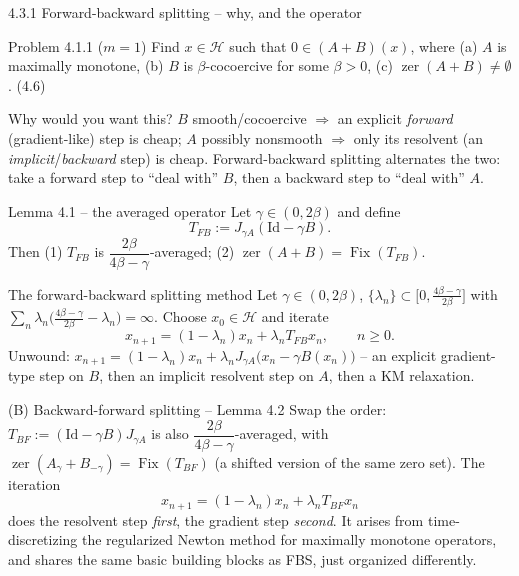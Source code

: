 \documentclass[aspectratio=169,10pt]{beamer}
\newcommand{\Id}{\mathrm{Id}}
\newcommand{\Fix}{\operatorname{Fix}}
\newcommand{\zer}{\operatorname{zer}}
\begin{document}
\begin{frame}[allowframebreaks]{4.3.1 Forward-backward splitting -- why, and the operator}
  \begin{block}{Problem 4.1.1 ($m=1$)}
    Find $x\in\mathcal H$ such that $0\in(A+B)(x)$, where (a) $A$ is maximally monotone, (b) $B$ is $\beta$-cocoercive for some $\beta>0$, (c) $\zer(A+B)\ne\emptyset$. (4.6)
  \end{block}
  \begin{block}{Why would you want this?}
    $B$ smooth/cocoercive $\Rightarrow$ an explicit \emph{forward} (gradient-like) step is cheap; $A$ possibly nonsmooth $\Rightarrow$ only its resolvent (an \emph{implicit}/\emph{backward} step) is cheap. Forward-backward splitting alternates the two: take a forward step to ``deal with'' $B$, then a backward step to ``deal with'' $A$.
  \end{block}
  \begin{block}{Lemma 4.1 -- the averaged operator}
    Let $\gamma\in(0,2\beta)$ and define
    \[
      T_{FB} := J_{\gamma A}(\Id-\gamma B).
    \]
    Then (1) $T_{FB}$ is $\dfrac{2\beta}{4\beta-\gamma}$-averaged; (2) $\zer(A+B)=\Fix(T_{FB})$.
  \end{block}

  \framebreak

  \begin{block}{The forward-backward splitting method}
    Let $\gamma\in(0,2\beta)$, $\{\lambda_n\}\subset\big[0,\tfrac{4\beta-\gamma}{2\beta}\big]$ with $\sum_n\lambda_n\big(\tfrac{4\beta-\gamma}{2\beta}-\lambda_n\big)=\infty$. Choose $x_0\in\mathcal H$ and iterate
    \begin{equation*}
      x_{n+1} = (1-\lambda_n)x_n + \lambda_n T_{FB}x_n, \qquad n\ge0. \tag{4.7}
    \end{equation*}
    Unwound: $x_{n+1}=(1-\lambda_n)x_n+\lambda_n J_{\gamma A}\big(x_n-\gamma B(x_n)\big)$ -- an explicit gradient-type step on $B$, then an implicit resolvent step on $A$, then a KM relaxation.
  \end{block}
  \begin{block}{(B) Backward-forward splitting -- Lemma 4.2}
    Swap the order: $T_{BF}:=(\Id-\gamma B)J_{\gamma A}$ is also $\dfrac{2\beta}{4\beta-\gamma}$-averaged, with $\zer(A_\gamma+B_{-\gamma})=\Fix(T_{BF})$ (a shifted version of the same zero set). The iteration
    \begin{equation*}
      x_{n+1} = (1-\lambda_n)x_n + \lambda_n T_{BF}x_n \tag{4.8}
    \end{equation*}
    does the resolvent step \emph{first}, the gradient step \emph{second}. It arises from time-discretizing the regularized Newton method for maximally monotone operators, and shares the same basic building blocks as FBS, just organized differently.
  \end{block}
\end{frame}
\end{document}
